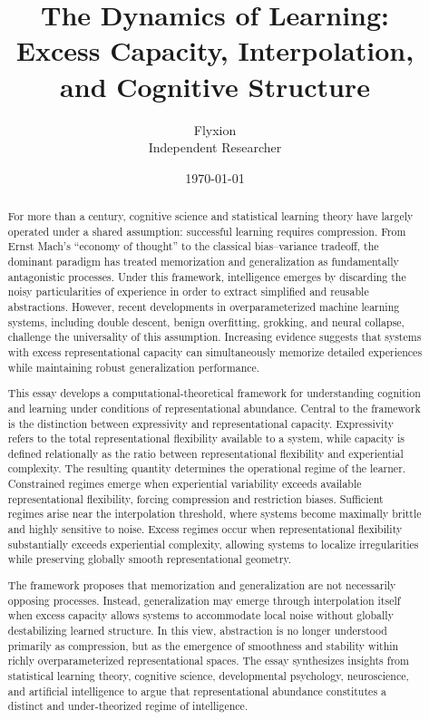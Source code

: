 \documentclass[12pt,a4paper]{article}
\title{
\Large \textbf{
The Dynamics of Learning: \\
Excess Capacity, Interpolation, \\
and Cognitive Structure
}
}
\author{
Flyxion \\
\small Independent Researcher
}
\date{\today}
\begin{document}
\maketitle

\begin{abstract}

For more than a century, cognitive science and statistical learning theory have largely operated under a shared assumption: successful learning requires compression. From Ernst Mach’s ``economy of thought'' to the classical bias--variance tradeoff, the dominant paradigm has treated memorization and generalization as fundamentally antagonistic processes. Under this framework, intelligence emerges by discarding the noisy particularities of experience in order to extract simplified and reusable abstractions. However, recent developments in overparameterized machine learning systems, including double descent, benign overfitting, grokking, and neural collapse, challenge the universality of this assumption. Increasing evidence suggests that systems with excess representational capacity can simultaneously memorize detailed experiences while maintaining robust generalization performance.

This essay develops a computational-theoretical framework for understanding cognition and learning under conditions of representational abundance. Central to the framework is the distinction between expressivity and representational capacity. Expressivity refers to the total representational flexibility available to a system, while capacity is defined relationally as the ratio between representational flexibility and experiential complexity. The resulting quantity determines the operational regime of the learner. Constrained regimes emerge when experiential variability exceeds available representational flexibility, forcing compression and restriction biases. Sufficient regimes arise near the interpolation threshold, where systems become maximally brittle and highly sensitive to noise. Excess regimes occur when representational flexibility substantially exceeds experiential complexity, allowing systems to localize irregularities while preserving globally smooth representational geometry.

The framework proposes that memorization and generalization are not necessarily opposing processes. Instead, generalization may emerge through interpolation itself when excess capacity allows systems to accommodate local noise without globally destabilizing learned structure. In this view, abstraction is no longer understood primarily as compression, but as the emergence of smoothness and stability within richly overparameterized representational spaces. The essay synthesizes insights from statistical learning theory, cognitive science, developmental psychology, neuroscience, and artificial intelligence to argue that representational abundance constitutes a distinct and under-theorized regime of intelligence.


\end{abstract}
\end{document}
